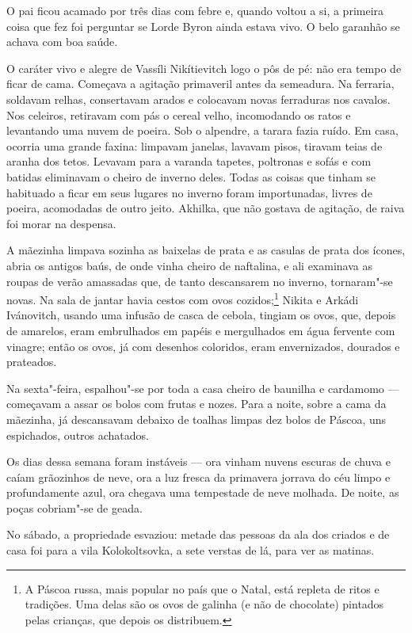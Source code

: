 O pai ficou acamado por três dias com febre e, quando voltou a si, a
primeira coisa que fez foi perguntar se Lorde Byron ainda estava vivo. O
belo garanhão se achava com boa saúde.

O caráter vivo e alegre de Vassíli Nikítievitch logo o pôs de pé: não
era tempo de ficar de cama. Começava a agitação primaveril antes da
semeadura. Na ferraria, soldavam relhas, consertavam arados e colocavam
novas ferraduras nos cavalos. Nos celeiros, retiravam com pás o cereal
velho, incomodando os ratos e levantando uma nuvem de poeira. Sob o
alpendre, a tarara fazia ruído. Em casa, ocorria uma grande faxina:
limpavam janelas, lavavam pisos, tiravam teias de aranha dos tetos.
Levavam para a varanda tapetes, poltronas e sofás e com batidas
eliminavam o cheiro de inverno deles. Todas as coisas que tinham se
habituado a ficar em seus lugares no inverno foram importunadas, livres
de poeira, acomodadas de outro jeito. Akhilka, que não gostava de
agitação, de raiva foi morar na despensa.

A mãezinha limpava sozinha as baixelas de prata e as casulas de prata
dos ícones, abria os antigos baús, de onde vinha cheiro de naftalina, e
ali examinava as roupas de verão amassadas que, de tanto descansarem no
inverno, tornaram"-se novas. Na sala de jantar havia cestos com ovos
cozidos;\footnote{A Páscoa russa, mais popular no país que o Natal, está
  repleta de ritos e tradições. Uma delas são os ovos de galinha (e não
  de chocolate) pintados pelas crianças, que depois os distribuem.}
Nikita e Arkádi Ivánovitch, usando uma infusão de casca de cebola,
tingiam os ovos, que, depois de amarelos, eram embrulhados em papéis e
mergulhados em água fervente com vinagre; então os ovos, já com desenhos
coloridos, eram envernizados, dourados e prateados.

Na sexta"-feira, espalhou"-se por toda a casa cheiro de baunilha e
cardamomo --- começavam a assar os bolos com frutas e nozes. Para a
noite, sobre a cama da mãezinha, já descansavam debaixo de toalhas
limpas dez bolos de Páscoa, uns espichados, outros achatados.

Os dias dessa semana foram instáveis --- ora vinham nuvens escuras de
chuva e caíam grãozinhos de neve, ora a luz fresca da primavera jorrava
do céu limpo e profundamente azul, ora chegava uma tempestade de neve
molhada. De noite, as poças cobriam"-se de geada.

No sábado, a propriedade esvaziou: metade das pessoas da ala dos criados
e de casa foi para a vila Kolokoltsovka, a sete verstas de lá,
para ver as matinas.

